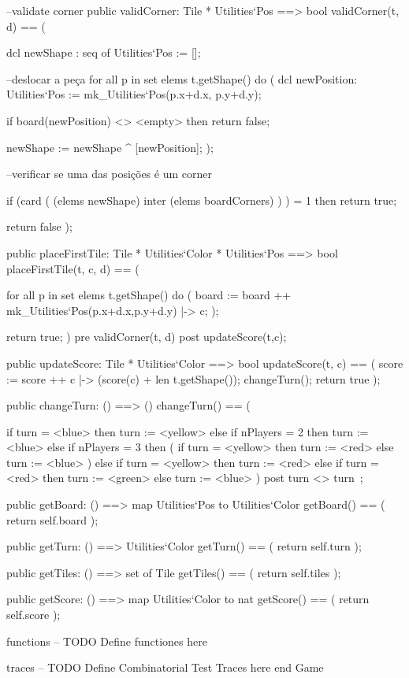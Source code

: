 \begin{vdm_al}
     --validate corner
        public validCorner: Tile * Utilities`Pos ==> bool
         validCorner(t, d) == (
          
    dcl newShape : seq of Utilities`Pos := [];

    --deslocar a peça
    for all p in set elems t.getShape() do (
     dcl newPosition: Utilities`Pos := mk_Utilities`Pos(p.x+d.x, p.y+d.y);
           
           if board(newPosition) <> <empty> then
            return false;
            
        newShape := newShape ^ [newPosition];
          );
          
       --verificar se uma das posições é um corner
       
          if (card ( (elems newShape) inter (elems boardCorners) ) ) = 1 then
           return true;

          return false
         );
     
        public placeFirstTile: Tile * Utilities`Color * Utilities`Pos ==> bool
      placeFirstTile(t, c, d) == (
       
          for all p in set elems t.getShape() do ( 
           board := board ++ {mk_Utilities`Pos(p.x+d.x,p.y+d.y) |-> c};
          );

       return true;
      )
      pre validCorner(t, d)
      post updateScore(t,c);
      
     public updateScore: Tile * Utilities`Color ==> bool
      updateScore(t, c) == (
       score := score ++ {c |-> (score(c) + len t.getShape())};
       changeTurn();
       return true
      );
         
  public changeTurn: () ==> ()
         changeTurn() == (
         
             if turn = <blue> then 
              turn := <yellow>
             else if nPlayers = 2 then
                 turn := <blue>
                else if nPlayers = 3 then (
                 if turn = <yellow> then
                  turn := <red>
              else
               turn := <blue>
                 )
             else if turn = <yellow> then
              turn := <red>
             else if turn = <red> then
              turn := <green>
          else
           turn := <blue>                
         )
         post turn <> turn~;
        
        public getBoard: () ==> map Utilities`Pos to Utilities`Color
         getBoard() == (
          return self.board
         );
         
     public getTurn: () ==> Utilities`Color
         getTurn() == (
          return self.turn
         );
         
     public getTiles: () ==> set of Tile
      getTiles() == (
       return self.tiles
      );
      
  public getScore: () ==> map Utilities`Color to nat
      getScore() == (
       return self.score
      );
        
        
 functions
-- TODO Define functiones here

 traces
-- TODO Define Combinatorial Test Traces here
end Game
\end{vdm_al}
